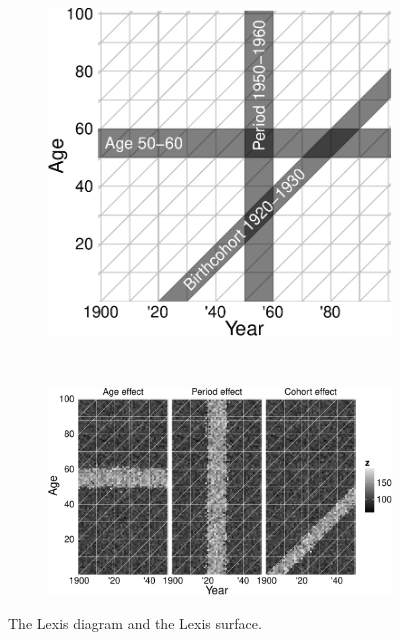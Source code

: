 \documentclass{scrartcl}
\begin{document}
\begin{figure}[!htb]
  \begin{subfigure}[t]{0.38\textwidth}
    \includegraphics[width = \linewidth]{../fig/lexis_exmpl.pdf}
    \label{fig:lexis_exmpl}
  \end{subfigure}%
  ~
  \begin{subfigure}[t]{0.62\textwidth}
    \includegraphics[width = \textwidth]{../fig/lexis_fx.pdf}
    \label{fig:lexis_fx}
  \end{subfigure}%
  \caption{The Lexis diagram and the Lexis surface.}
  \label{fig:lexis}
\end{figure}
\end{document}
